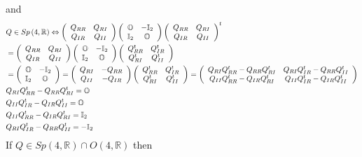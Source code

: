 \documentclass[aps,preprint]{revtex4}%
\begin{document}
and%
\begin{align}
&  Q\in Sp\left(  4,\mathbb{R}\right)  \Leftrightarrow\left(
\begin{array}
[c]{cc}%
Q_{RR} & Q_{RI}\\
Q_{IR} & Q_{II}%
\end{array}
\right)  \left(
\begin{array}
[c]{cc}%
\mathbb{O} & \mathbb{-I}_{2}\\
\mathbb{I}_{2} & \mathbb{O}%
\end{array}
\right)  \left(
\begin{array}
[c]{cc}%
Q_{RR} & Q_{RI}\\
Q_{IR} & Q_{II}%
\end{array}
\right)  ^{t}\\
&  =\left(
\begin{array}
[c]{cc}%
Q_{RR} & Q_{RI}\\
Q_{IR} & Q_{II}%
\end{array}
\right)  \left(
\begin{array}
[c]{cc}%
\mathbb{O} & \mathbb{-I}_{2}\\
\mathbb{I}_{2} & \mathbb{O}%
\end{array}
\right)  \left(
\begin{array}
[c]{cc}%
Q_{RR}^{t} & Q_{IR}^{t}\\
Q_{RI}^{t} & Q_{II}^{t}%
\end{array}
\right) \\
&  =\left(
\begin{array}
[c]{cc}%
\mathbb{O} & \mathbb{-I}_{2}\\
\mathbb{I}_{2} & \mathbb{O}%
\end{array}
\right)  =\left(
\begin{array}
[c]{cc}%
Q_{RI} & -Q_{RR}\\
Q_{II} & -Q_{IR}%
\end{array}
\right)  \left(
\begin{array}
[c]{cc}%
Q_{RR}^{t} & Q_{IR}^{t}\\
Q_{RI}^{t} & Q_{II}^{t}%
\end{array}
\right)  =\left(
\begin{array}
[c]{cc}%
Q_{RI}Q_{RR}^{t}-Q_{RR}Q_{RI}^{t} & Q_{RI}Q_{IR}^{t}-Q_{RR}Q_{II}^{t}\\
Q_{II}Q_{RR}^{t}-Q_{IR}Q_{RI}^{t} & Q_{II}Q_{IR}^{t}-Q_{IR}Q_{II}^{t}%
\end{array}
\right) \\
&  Q_{RI}Q_{RR}^{t}-Q_{RR}Q_{RI}^{t}=\mathbb{O}\\
&  Q_{II}Q_{IR}^{t}-Q_{IR}Q_{II}^{t}=\mathbb{O}\\
&  Q_{II}Q_{RR}^{t}-Q_{IR}Q_{RI}^{t}=\mathbb{I}_{2}\\
&  Q_{RI}Q_{IR}^{t}-Q_{RR}Q_{II}^{t}=-\mathbb{I}_{2}%
\end{align}
If $Q\in Sp\left(  4,\mathbb{R}\right)  \cap O\left(  4,\mathbb{R}\right)  $ then
\end{document}
